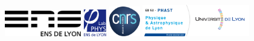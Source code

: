 \thispagestyle{empty}


\\
\vspace*{0.1cm}
\includegraphics[width=0.25\textwidth]{Intro-Conclusion/LogoENS.pdf}
\includegraphics[width=0.075\textwidth]{Intro-Conclusion/LogoLabPhys.pdf}
\hfill
\includegraphics[width=0.1\textwidth]{Intro-Conclusion/LogoCNRS.pdf}
\hfill\includegraphics[width=0.35\textwidth]{Intro-Conclusion/LogoPHASTUnivLyon.pdf}

